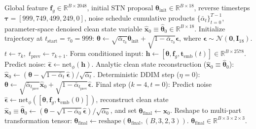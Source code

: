 \begin{algorithm}[ht]
\scriptsize
\caption{Accelerated Analytic 5-Step DDIM Reverse Trajectory (P5)}
\label{alg:ddim_5step}
\begin{algorithmic}[1]
\Require Global feature $\mathbf{f}_g \in \mathbb{R}^{B \times 2048}$, initial STN proposal $\boldsymbol{\theta}_{\text{init}} \in \mathbb{R}^{B \times 18}$, reverse timesteps $\boldsymbol{\tau} = [999, 749, 499, 249, 0]$, noise schedule cumulative products $\{\bar{\alpha}_t\}_{t=0}^{T-1}$, parameter-space denoised clean state variable $\hat{\mathbf{x}}_0 \equiv \hat{\boldsymbol{\theta}}_0 \in \mathbb{R}^{B \times 18}$.
\State Initialize trajectory at $t_{\text{start}} = \tau_0 = 999$: $\boldsymbol{\theta} \leftarrow \sqrt{\bar{\alpha}_{\tau_0}}\boldsymbol{\theta}_{\text{init}} + \sqrt{1 - \bar{\alpha}_{\tau_0}}\boldsymbol{\epsilon}$, where $\boldsymbol{\epsilon} \sim \mathcal{N}(\mathbf{0}, \mathbf{I}_{18})$.
    \State $t \leftarrow \tau_k, \; t_{\text{prev}} \leftarrow \tau_{k+1}$.
    \State Form conditioned input: $\mathbf{h} \leftarrow [\boldsymbol{\theta}, \mathbf{f}_g, \mathbf{t}_{\text{emb}}(t)] \in \mathbb{R}^{B \times 2578}$.
    \State Predict noise: $\hat{\boldsymbol{\epsilon}} \leftarrow \text{net}_\phi(\mathbf{h})$.
    \State Analytic clean state reconstruction ($\hat{\mathbf{x}}_0 \equiv \hat{\boldsymbol{\theta}}_0$): $\hat{\mathbf{x}}_0 \leftarrow (\boldsymbol{\theta} - \sqrt{1 - \bar{\alpha}_t}\hat{\boldsymbol{\epsilon}}) / \sqrt{\bar{\alpha}_t}$.
    \State Deterministic DDIM step ($\eta=0$): $\boldsymbol{\theta} \leftarrow \sqrt{\bar{\alpha}_{t_{\text{prev}}}}\hat{\mathbf{x}}_0 + \sqrt{1 - \bar{\alpha}_{t_{\text{prev}}}}\hat{\boldsymbol{\epsilon}}$.
\EndFor
\State Final step ($k=4, t=0$): Predict noise $\hat{\boldsymbol{\epsilon}} \leftarrow \text{net}_\phi([\boldsymbol{\theta}, \mathbf{f}_g, \mathbf{t}_{\text{emb}}(0)])$, reconstruct clean state $\hat{\mathbf{x}}_0 \equiv \hat{\boldsymbol{\theta}}_0 \leftarrow (\boldsymbol{\theta} - \sqrt{1 - \bar{\alpha}_0}\hat{\boldsymbol{\epsilon}}) / \sqrt{\bar{\alpha}_0}$, and set $\boldsymbol{\theta}_{\text{final}} \leftarrow \hat{\mathbf{x}}_0$.
\State Reshape to multi-part transformation tensor: $\boldsymbol{\theta}_{\text{final}} \leftarrow \text{reshape}(\boldsymbol{\theta}_{\text{final}}, (B, 3, 2, 3))$.
\State \Return $\boldsymbol{\theta}_{\text{final}} \in \mathbb{R}^{B \times 3 \times 2 \times 3}$.
\end{algorithmic}
\end{algorithm}
